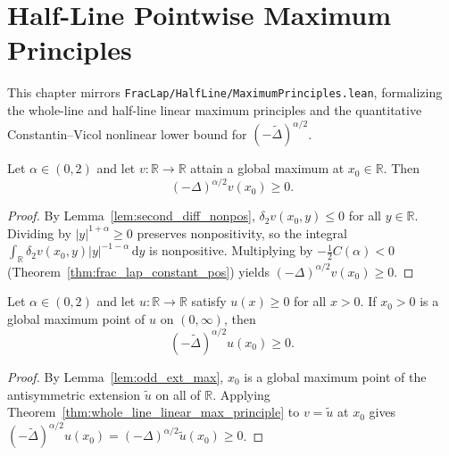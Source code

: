 \chapter{Half-Line Pointwise Maximum Principles}

This chapter mirrors \texttt{FracLap/HalfLine/MaximumPrinciples.lean}, formalizing the whole-line and half-line linear maximum principles and the quantitative Constantin--Vicol nonlinear lower bound for $(-\widetilde{\Delta})^{\alpha/2}$.

\begin{theorem}\label{thm:whole_line_linear_max_principle}
\leanok
Let $\alpha \in (0, 2)$ and let $v : \mathbb{R} \to \mathbb{R}$ attain a global maximum at $x_0 \in \mathbb{R}$. Then
\[
  (-\Delta)^{\alpha/2} v(x_0) \ge 0.
\]
\end{theorem}

\begin{proof}
\leanok
By Lemma~\ref{lem:second_diff_nonpos}, $\delta_2 v(x_0, y) \le 0$ for all $y \in \mathbb{R}$. Dividing by $\lvert y \rvert^{1 + \alpha} \ge 0$ preserves nonpositivity, so the integral $\int_{\mathbb{R}} \delta_2 v(x_0, y) \lvert y \rvert^{-1-\alpha}\, \mathrm{d}y$ is nonpositive. Multiplying by $-\frac{1}{2} C(\alpha) < 0$ (Theorem~\ref{thm:frac_lap_constant_pos}) yields $(-\Delta)^{\alpha/2} v(x_0) \ge 0$.
\end{proof}

\begin{theorem}\label{thm:half_line_linear_max_principle}
\leanok
Let $\alpha \in (0, 2)$ and let $u : \mathbb{R} \to \mathbb{R}$ satisfy $u(x) \ge 0$ for all $x > 0$. If $x_0 > 0$ is a global maximum point of $u$ on $(0, \infty)$, then
\[
  (-\widetilde{\Delta})^{\alpha/2} u(x_0) \ge 0.
\]
\end{theorem}

\begin{proof}
\leanok
By Lemma~\ref{lem:odd_ext_max}, $x_0$ is a global maximum point of the antisymmetric extension $\widetilde{u}$ on all of $\mathbb{R}$. Applying Theorem~\ref{thm:whole_line_linear_max_principle} to $v = \widetilde{u}$ at $x_0$ gives $(-\widetilde{\Delta})^{\alpha/2} u(x_0) = (-\Delta)^{\alpha/2} \widetilde{u}(x_0) \ge 0$.
\end{proof}

